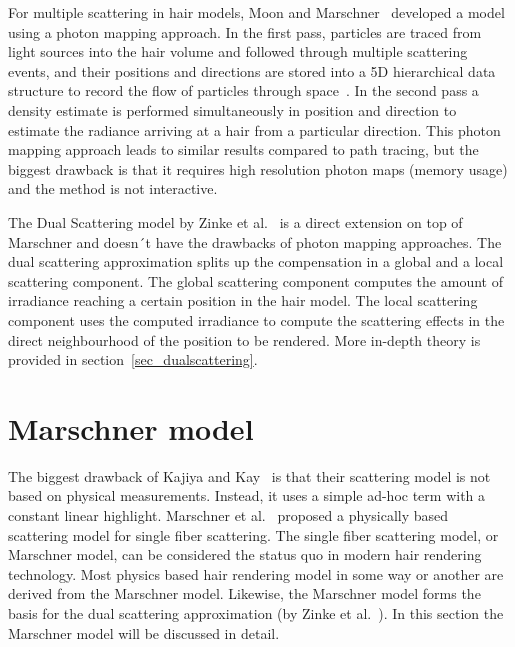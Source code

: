 \documentclass[11pt,a4paper]{report}
\begin{document}
For multiple scattering in hair models, Moon and Marschner~\cite{moon} developed a model using a photon mapping approach. In the first pass, particles are traced from light sources into the hair volume and followed through multiple scattering events, and their positions and directions are stored into a 5D hierarchical data structure to record the flow of particles through space~\cite{moon}. In the second pass a density estimate is performed simultaneously in position and direction to estimate the radiance arriving at a hair from a particular direction.  This photon mapping approach leads to similar results compared to path tracing, but the biggest drawback is that it requires high resolution photon maps (memory usage) and the method is not interactive.

The Dual Scattering model by Zinke et al.~\cite{zinke} is a direct extension on top of Marschner and doesn´t have the drawbacks of photon mapping approaches. The dual scattering approximation splits up the compensation in a global and a local scattering component. The global scattering component computes the amount of irradiance reaching a certain position in the hair model. The local scattering component uses the computed irradiance to compute the scattering effects in the direct neighbourhood of the position to be rendered. More in-depth theory is provided in section~\ref{sec_dualscattering}.

%
%

\section{Marschner model}
\label{sec_marschner}
%
%

The biggest drawback of Kajiya and Kay~\cite{kajiya} is that their scattering model is not based on physical measurements. Instead, it uses a simple ad-hoc term with a constant linear highlight. Marschner et al.~\cite{marschner} proposed a physically based scattering model for single fiber scattering. The single fiber scattering model, or Marschner model, can be considered the status quo in modern hair rendering technology. Most physics based hair rendering model in some way or another are derived from the Marschner model. Likewise, the Marschner model forms the basis for the dual scattering approximation (by Zinke et al.~\cite{zinke}). In this section the Marschner model will be discussed in detail.
\end{document}
